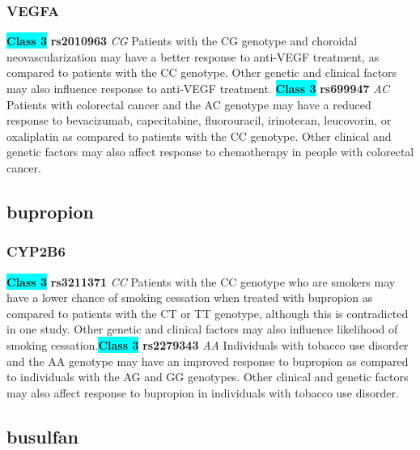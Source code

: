 \documentclass{book}
\begin{document}
\subsubsection{ VEGFA }

\begin{center}
\textbf{\colorbox{cyan} {Class 3}} \textbf{ rs2010963 } \textit{ CG }
Patients with the CG genotype and choroidal neovascularization may have a better response to anti-VEGF treatment, as compared to patients with the CC genotype. Other genetic and clinical factors may also influence response to anti-VEGF treatment. \textbf{\colorbox{cyan} {Class 3}} \textbf{ rs699947 } \textit{ AC }
Patients with colorectal cancer and the AC genotype may have a reduced response to bevacizumab, capecitabine, fluorouracil, irinotecan, leucovorin, or oxaliplatin as compared to patients with the CC genotype. Other clinical and genetic factors may also affect response to chemotherapy in people with colorectal cancer.


\end{center}\subsection{ bupropion }


\subsubsection{ CYP2B6 }

\begin{center}
\textbf{\colorbox{cyan} {Class 3}} \textbf{ rs3211371 } \textit{ CC }
Patients with the CC genotype who are smokers may have a lower chance of smoking cessation when treated with bupropion as compared to patients with the CT or TT genotype, although this is contradicted in one study. Other genetic and clinical factors may also influence likelihood of smoking cessation.\textbf{\colorbox{cyan} {Class 3}} \textbf{ rs2279343 } \textit{ AA }
Individuals with tobacco use disorder and the AA genotype may have an improved response to bupropion as compared to individuals with the AG and GG genotypes. Other clinical and genetic factors may also affect response to bupropion in individuals with tobacco use disorder. 


\end{center}\subsection{ busulfan }
\end{document}
